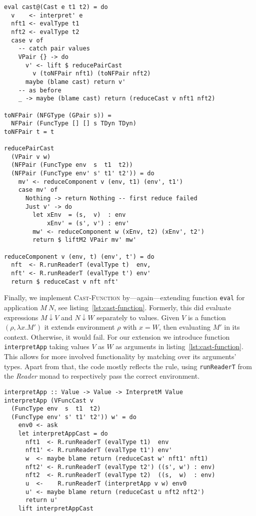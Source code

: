 \begin{lstlisting}[float,
  caption=Haskell: Rule \textsc{Cast-Pair} (\texttt{Interpreter.hs}),
  label=lst:pair-cast]
eval cast@(Cast e t1 t2) = do
  v    <- interpret' e
  nft1 <- evalType t1
  nft2 <- evalType t2
  case v of
    -- catch pair values
    VPair {} -> do
      v' <- lift $ reducePairCast
        v (toNFPair nft1) (toNFPair nft2)
      maybe (blame cast) return v'
    -- as before
    _ -> maybe (blame cast) return (reduceCast v nft1 nft2)

toNFPair (NFGType (GPair s)) =
  NFPair (FuncType [] [] s TDyn TDyn)
toNFPair t = t

reducePairCast
  (VPair v w)
  (NFPair (FuncType env  s  t1  t2))
  (NFPair (FuncType env' s' t1' t2')) = do
    mv' <- reduceComponent v (env, t1) (env', t1')
    case mv' of
      Nothing -> return Nothing -- first reduce failed
      Just v' -> do
        let xEnv  = (s,  v)  : env
            xEnv' = (s', v') : env'
        mw' <- reduceComponent w (xEnv, t2) (xEnv', t2')
        return $ liftM2 VPair mv' mw'

reduceComponent v (env, t) (env', t') = do
  nft  <- R.runReaderT (evalType t)  env,
  nft' <- R.runReaderT (evalType t') env'
  return $ reduceCast v nft nft'
\end{lstlisting}

Finally, we implement \textsc{Cast-Function} by---again---extending function \texttt{eval} for application $M~N$, see listing~\ref{lst:cast-function}. Formerly, this did evaluate expressions $M \downarrow V$ and $N \downarrow W$ separately to values. Given $V$ is a function $(\rho, \lambda x. M')$ it extends environment $\rho$ with $x=W$, then evaluating $M'$ in its context. Otherwise, it would fail. For our extension we introduce function \texttt{interpretApp} taking values $V$ as $W$ as arguments in listing~\ref{lst:cast-function}. This allows for more involved functionality by matching over its arguments' types. Apart from that, the code mostly reflects the rule, using \texttt{runReaderT} from the \emph{Reader} monad to respectively pass the correct environment.

\begin{lstlisting}[float,
  caption=Haskell: Rule \textsc{Cast-Function} (\texttt{Interpreter.hs}),
  label=lst:cast-function]
interpretApp :: Value -> Value -> InterpretM Value
interpretApp (VFuncCast v
  (FuncType env  s  t1  t2)
  (FuncType env' s' t1' t2')) w' = do
    env0 <- ask
    let interpretAppCast = do
      nft1  <- R.runReaderT (evalType t1)  env
      nft1' <- R.runReaderT (evalType t1') env'
      w  <- maybe blame return (reduceCast w' nft1' nft1)
      nft2' <- R.runReaderT (evalType t2') ((s', w') : env)
      nft2  <- R.runReaderT (evalType t2)  ((s,  w)  : env)
      u  <-    R.runReaderT (interpretApp v w) env0
      u' <- maybe blame return (reduceCast u nft2 nft2')
      return u'
    lift interpretAppCast
\end{lstlisting}

